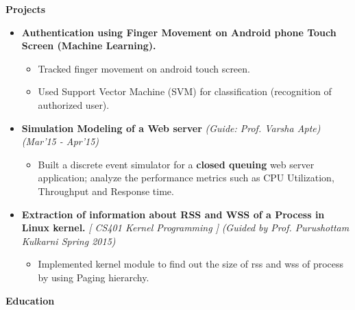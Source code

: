 \documentclass[a4paper,10pt]{article}
\newcommand{\resheading}[1]{{\small \colorbox{mygrey}{\begin{minipage}{0.988\textwidth}{\textbf{ \vphantom{p\^{E}} \large #1}}\end{minipage}}}}
\begin{document}
\vspace{-0.25cm}
\resheading{ Projects}
\begin{itemize}
\item \textbf{Authentication using Finger Movement on Android phone Touch Screen (Machine Learning).}\hfill \\[-0.6cm]
\begin{itemize}
	\item Tracked finger movement on android touch screen.\\[-0.6cm]
	\item Used Support Vector Machine (SVM) for classification (recognition of authorized user).\\[-0.6cm]
\end{itemize}
\vspace{-0.30cm}


\item \textbf{Simulation Modeling of a Web server} 
\emph{(Guide: Prof. Varsha Apte)} \hfill \emph{(Mar'15 - Apr'15)} \\[-0.6cm]
\begin{itemize}
\item Built a discrete event simulator for a \textbf{closed queuing} web server application; analyze the performance metrics such as CPU Utilization, Throughput and Response time. \\[-0.5cm]

\end{itemize}
	\item \textbf{Extraction of information about RSS and WSS of a Process in Linux kernel.} \hfill \emph{[ CS401 Kernel Programming ]}\hfill 
\emph{(Guided by Prof. Purushottam Kulkarni Spring 2015)} \\[-0.8cm]
\begin{itemize}
\item Implemented kernel module to find out the size of rss and wss of process by using Paging hierarchy. \\[-0.6cm]
\end{itemize}
\end{itemize}


\resheading{Education}
\end{document}
